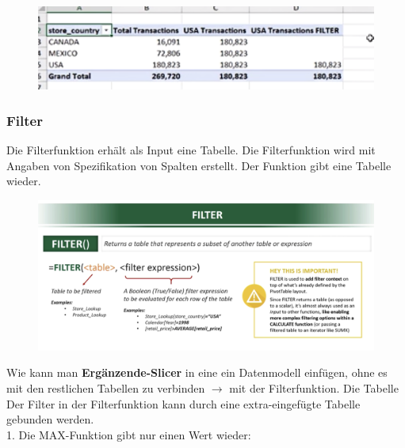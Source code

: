 \begin{figure}[H]
	\centering
	\includegraphics[scale = 0.3]{attachment/chapter_1/screenshot099}
	\caption{}
	\label{fig:screenshot099}
\end{figure} 

\subsubsection{Filter}
Die Filterfunktion erhält als Input eine Tabelle. Die Filterfunktion wird mit Angaben von Spezifikation von Spalten erstellt. Der Funktion gibt eine Tabelle wieder.

\begin{figure}[H]
	\centering
	\includegraphics[scale = 0.3]{attachment/chapter_1/screenshot100}
	\caption{}
	\label{fig:screenshot100}
\end{figure} 


Wie kann man \textbf{Ergänzende-Slicer} in eine ein Datenmodell einfügen, ohne es mit den restlichen Tabellen zu verbinden $\rightarrow$ mit der Filterfunktion. Die Tabelle Der Filter in der Filterfunktion kann durch eine extra-eingefügte Tabelle gebunden werden. \\ 

1. Die MAX-Funktion gibt nur einen Wert wieder:

